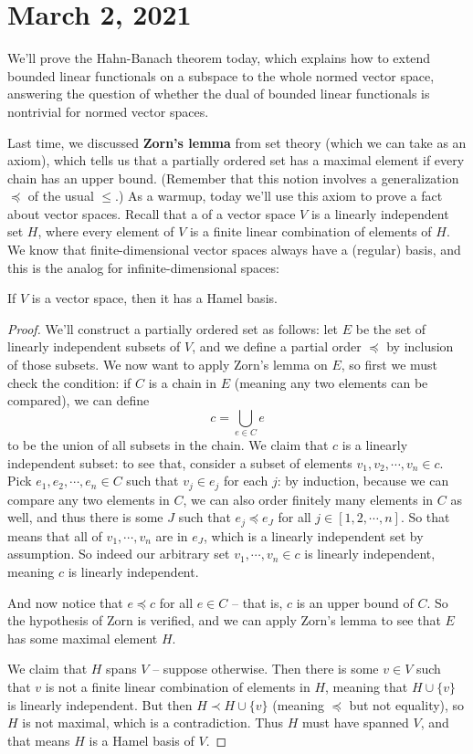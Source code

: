 \pagebreak\section*{March 2, 2021}

We'll prove the Hahn-Banach theorem today, which explains how to extend bounded linear functionals on a subspace to the whole normed vector space, answering the question of whether the dual of bounded linear functionals is nontrivial for normed vector spaces. 

Last time, we discussed \textbf{Zorn's lemma} from set theory (which we can take as an axiom), which tells us that a partially ordered set has a maximal element if every chain has an upper bound. (Remember that this notion involves a generalization $\preceq$ of the usual $\le$.) As a warmup, today we'll use this axiom to prove a fact about vector spaces. Recall that a  of a vector space $V$ is a linearly independent set $H$, where every element of $V$ is a finite linear combination of elements of $H$. We know that finite-dimensional vector spaces always have a (regular) basis, and this is the analog for infinite-dimensional spaces:

\begin{theorem}
If $V$ is a vector space, then it has a Hamel basis.
\end{theorem}
\begin{proof}
We'll construct a partially ordered set as follows: let $E$ be the set of linearly independent subsets of $V$, and we define a partial order $\preceq$ by inclusion of those subsets. We now want to apply Zorn's lemma on $E$, so first we must check the condition: if $C$ is a chain in $E$ (meaning any two elements can be compared), we can define 
\[
    c = \bigcup_{e \in C} e
\]
to be the union of all subsets in the chain. We claim that $c$ is a linearly independent subset: to see that, consider a subset of elements $v_1, v_2, \cdots, v_n \in c$. Pick $e_1, e_2, \cdots, e_n \in C$ such that $v_j \in e_j$ for each $j$: by induction, because we can compare any two elements in $C$, we can also order finitely many elements in $C$ as well, and thus there is some $J$ such that $e_j \preceq e_J$ for all $j \in [1, 2, \cdots, n]$. So that means that all of $v_1, \cdots, v_n$ are in $e_J$, which is a linearly independent set by assumption. So indeed our arbitrary set $v_1, \cdots, v_n \in c$ is linearly independent, meaning $c$ is linearly independent.

And now notice that $e \preceq c$ for all $e \in C$ -- that is, $c$ is an upper bound of $C$. So the hypothesis of Zorn is verified, and we can apply Zorn's lemma to see that $E$ has some maximal element $H$.

We claim that $H$ spans $V$ -- suppose otherwise. Then there is some $v \in V$ such that $v$ is not a finite linear combination of elements in $H$, meaning that $H \cup \{v\}$ is linearly independent. But then $H \prec H \cup\{v\}$ (meaning $\preceq$ but not equality), so $H$ is not maximal, which is a contradiction. Thus $H$ must have spanned $V$, and that means $H$ is a Hamel basis of $V$. 
\end{proof}

